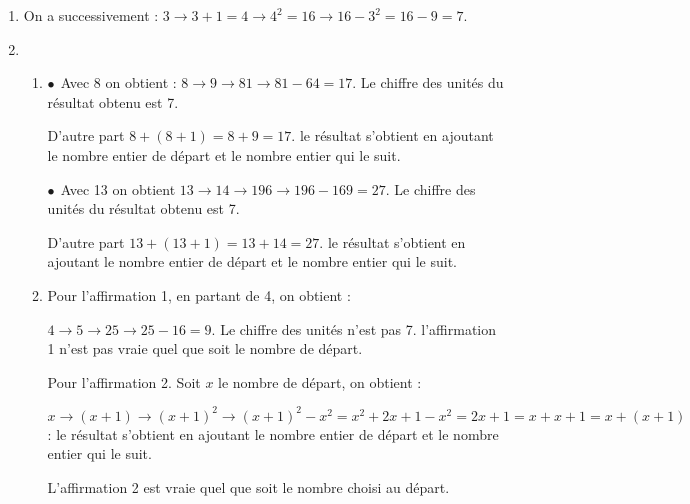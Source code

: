 
\medskip

% 

\begin{enumerate}
\item %

On a successivement : $3 \to 3 + 1 = 4 \to 4^2 = 16 \to 16 - 3^2 = 16 - 9 = 7$.
\item %


	\begin{enumerate}
		\item %
$\bullet~~$Avec 8 on obtient : $8 \to 9 \to 81 \to 81- 64 = 17$. Le chiffre des unités du résultat obtenu est 7.

D'autre part $8 + (8 + 1) = 8 + 9 = 17$. le résultat s'obtient en ajoutant le nombre entier de départ et le nombre entier qui le suit.

$\bullet~~$Avec 13 on obtient $13 \to 14 \to 196 \to 196 - 169 = 27$. Le chiffre des unités du résultat obtenu est 7.

D'autre part $13 + (13 + 1) = 13 + 14 = 27$. le résultat s'obtient en ajoutant le nombre entier de départ et le nombre entier qui le suit.
		\item %
		Pour l'affirmation 1, en partant de 4, on obtient :
		
		$4 \to 5 \to 25 \to 25 - 16 = 9$. Le chiffre des unités n'est pas 7. l'affirmation 1 n'est pas vraie quel que soit le nombre de départ.
		
		Pour l'affirmation 2. Soit $x$ le nombre de départ, on obtient :
		
$x \to (x + 1) \to (x + 1)^2 \to (x + 1)^2 - x^2 = x^2 + 2x + 1 - x ^2 = 2x + 1 = x + x + 1 = x + (x + 1)$ : le résultat s'obtient en ajoutant le nombre entier de départ et le nombre entier qui le suit.

L'affirmation 2 est vraie quel que soit le nombre choisi au départ.
	\end{enumerate}
\end{enumerate}

\bigskip


\bigskip

